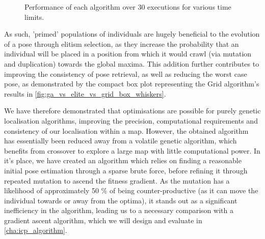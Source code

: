 \documentclass[authoryearcitations]{UoYCSproject}
\begin{document}
\begin{figure}
	\caption[Grid, Elitism, Benchmark time-adjusted performance.]{Performance of each algorithm over 30 executions for various time limits.}
	\label{fig:ga_vs_elite_vs_grid_box_whiskers}
\end{figure}

As such, 'primed' populations of individuals are hugely beneficial to the evolution of a pose through elitism selection, as they increase the probability that an individual will be placed in a position from which it would crawl (via mutation and duplication) towards the global maxima. This addition further contributes to improving the consistency of pose retrieval, as well as reducing the worst case pose, as demonstrated by the compact box plot representing the Grid algorithm's results in \autoref{fig:ga_vs_elite_vs_grid_box_whiskers}. \newline


\color{red}
We have therefore demonstrated that optimisations are possible for purely genetic localisation algorithms, improving the precision, computational requirements and consistency of our localisation within a map. However, the obtained algorithm has essentially been reduced away from a volatile genetic algorithm, which benefits from crossover to explore a large map with little computational power. In it's place, we have created an algorithm which relies on finding a reasonable initial pose estimation through a sparse brute force, before refining it through repeated mutation to ascend the fitness gradient. As the mutation has a likelihood of approximately 50 \% of being counter-productive (as it can move the individual towards or away from the optima), it stands out as a significant inefficiency in the algorithm, leading us to a necessary comparison with a gradient ascent algorithm, which we will design and evaluate in \autoref{cha:icp_algorithm}.
\end{document}
